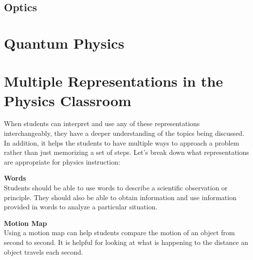 \documentclass[dvipsnames]{article}
\newif\ifShowUnitXIV
\begin{document}
\subsection{Optics}

\fi



\clearpage

\section{Quantum Physics}

\ifShowUnitXIV

Quantum stuff goes here.

\fi

\clearpage

\section*{Multiple Representations in the Physics Classroom}

When students can interpret and use any of these representations interchangeably, they have a deeper understanding of the topics being discussed.  In addition, it helps the students to have multiple ways to approach a problem rather than just memorizing a set of steps.  Let’s break down what representations are appropriate for physics instruction:

\textbf{Words}\\
Students should be able to use words to describe a scientific observation or principle.  They should also be able to obtain information and use information provided in words to analyze a particular situation.

\textbf{Motion Map}\\ 
Using a motion map can help students compare the motion of an object from second to second. It is helpful for looking at what is happening to the distance an object travels each second. 

\begin{center}
\end{center}
\end{document}
